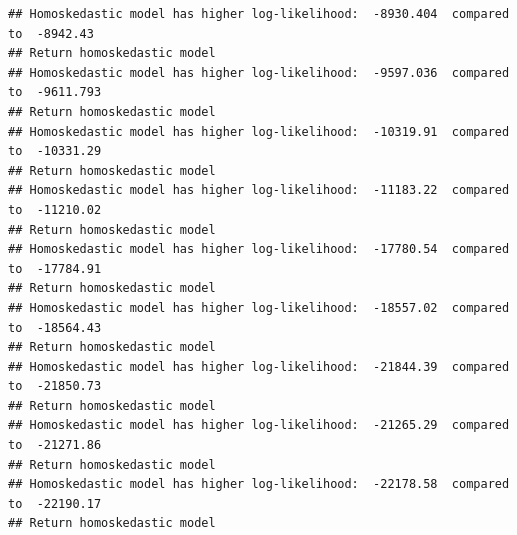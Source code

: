 \documentclass[]{article}
\newenvironment{Shaded}{\begin{snugshade}}{\end{snugshade}}
\newcommand{\KeywordTok}[1]{\textcolor[rgb]{0.13,0.29,0.53}{\textbf{#1}}}
\newcommand{\DataTypeTok}[1]{\textcolor[rgb]{0.13,0.29,0.53}{#1}}
\newcommand{\DecValTok}[1]{\textcolor[rgb]{0.00,0.00,0.81}{#1}}
\newcommand{\OperatorTok}[1]{\textcolor[rgb]{0.81,0.36,0.00}{\textbf{#1}}}
\newcommand{\NormalTok}[1]{#1}
\begin{document}
\begin{verbatim}
## Homoskedastic model has higher log-likelihood:  -8930.404  compared to  -8942.43
## Return homoskedastic model
## Homoskedastic model has higher log-likelihood:  -9597.036  compared to  -9611.793
## Return homoskedastic model
## Homoskedastic model has higher log-likelihood:  -10319.91  compared to  -10331.29
## Return homoskedastic model
## Homoskedastic model has higher log-likelihood:  -11183.22  compared to  -11210.02
## Return homoskedastic model
## Homoskedastic model has higher log-likelihood:  -17780.54  compared to  -17784.91
## Return homoskedastic model
## Homoskedastic model has higher log-likelihood:  -18557.02  compared to  -18564.43
## Return homoskedastic model
## Homoskedastic model has higher log-likelihood:  -21844.39  compared to  -21850.73
## Return homoskedastic model
## Homoskedastic model has higher log-likelihood:  -21265.29  compared to  -21271.86
## Return homoskedastic model
## Homoskedastic model has higher log-likelihood:  -22178.58  compared to  -22190.17
## Return homoskedastic model
\end{verbatim}

\begin{Shaded}
\end{Shaded}
\end{document}
